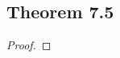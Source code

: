 \documentclass[../../main.tex]{subfiles}
\begin{document}
\subsection{Theorem 7.5}
\begin{wts}

\end{wts}
\begin{proof}

\end{proof}
\end{document}
